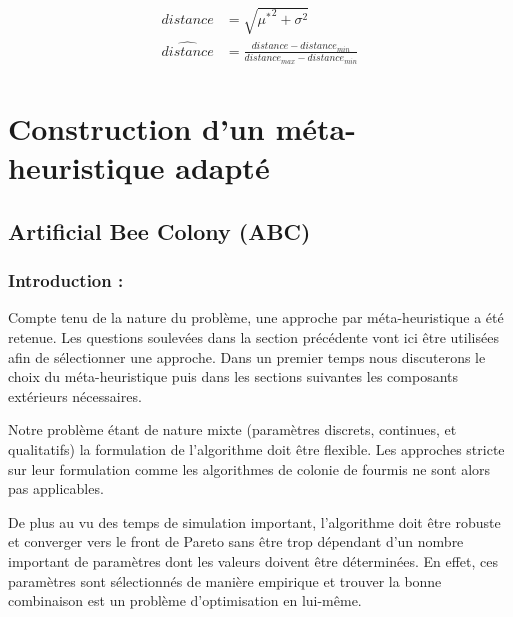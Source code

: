 \begin{align}\label{eq:distance_norm}
    \begin{split}
        distance        &= \sqrt{{\mu^{*}}^2 + \sigma^{2}} \\
        \hat{distance}  &=  \frac{distance - distance_{min}}{distance_{max} - distance_{min}}
    \end{split}
\end{align}





\section{Construction d’un méta-heuristique adapté} %
\label{sec:construction_d_un_meta_heuristique_adapte}
\subsection{Artificial Bee Colony (ABC)} %
\label{sub:artificial_bee_colony}
\subsubsection{Introduction :} %
\label{ssub:introduction}
Compte tenu de la nature du problème, une approche par méta-heuristique
a été retenue. Les questions soulevées dans la section précédente vont ici être utilisées
afin de sélectionner une approche. Dans un premier temps nous discuterons le choix
du méta-heuristique puis dans les sections suivantes les composants extérieurs
nécessaires.

Notre problème étant de nature mixte (paramètres discrets, continues, et qualitatifs)
la formulation de l’algorithme doit être flexible. Les approches stricte sur leur
formulation comme les algorithmes de colonie de fourmis ne sont alors pas applicables.

De plus au vu des temps de simulation important, l’algorithme doit être robuste
et converger vers le front de Pareto sans être trop dépendant d’un nombre important
de paramètres dont les valeurs doivent être déterminées. En effet, ces paramètres
sont sélectionnés de manière empirique et trouver la bonne combinaison est un problème
d’optimisation en lui-même.

